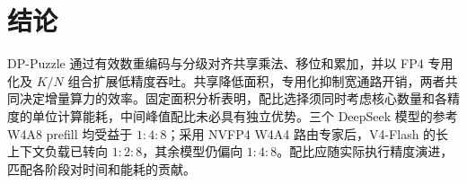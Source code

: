 \section{结论}
\label{sec:conclusion}

DP-Puzzle 通过有效数重编码与分级对齐共享乘法、移位和累加，并以 FP4 专用化及 $K/N$ 组合扩展低精度吞吐。共享降低面积，专用化抑制宽通路开销，两者共同决定增量算力的效率。固定面积分析表明，配比选择须同时考虑核心数量和各精度的单位计算能耗，中间峰值配比未必具有独立优势。三个 DeepSeek 模型的参考 W4A8 prefill 均受益于 $1:4:8$；采用 NVFP4 W4A4 路由专家后，V4-Flash 的长上下文负载已转向 $1:2:8$，其余模型仍偏向 $1:4:8$。配比应随实际执行精度演进，匹配各阶段对时间和能耗的贡献。
